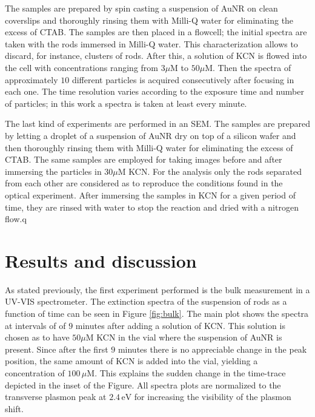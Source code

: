 \documentclass[twocolumn]{article}
\begin{document}
The samples are prepared by spin casting a suspension of AuNR on clean
coverslips and thoroughly rinsing them  with Milli-Q water for eliminating the
excess of CTAB. The samples are then placed in a flowcell; the initial spectra
are taken with the rods immersed in Milli-Q water. This characterization allows
to discard, for instance, clusters of rods. After this, a solution of KCN is
flowed into the cell with concentrations ranging from $3\mu\textrm{M}$ to
$50\mu\textrm{M}$. Then the spectra of approximately $10$ different particles is
acquired consecutively after focusing in each one. The time resolution varies
according to the exposure time and number of particles; in this work a spectra
is taken at least every minute.

The last kind of experiments are performed in an SEM. The samples are prepared
by letting a droplet of a suspension of AuNR dry on top of a silicon wafer and
then thoroughly rinsing them with Milli-Q water for eliminating the excess of
CTAB. The same samples are employed for taking images before and after immersing
the particles in $30\mu\textrm{M}$ KCN. For the analysis only the rods separated
from each other are considered as to reproduce the conditions found in the
optical experiment. After immersing the samples in KCN for a given period of
time, they are rinsed with water to stop the reaction and dried with a nitrogen
flow.q

\section{Results and discussion}

As stated previously, the first experiment performed is the bulk measurement in
a UV-VIS spectrometer. The extinction spectra of the suspension of rods as a
function of time can be seen in Figure \ref{fig:bulk}. The main plot shows the
spectra at intervals of of $9$ minutes after adding a solution of KCN. This
solution is chosen as to have $50\mu\textrm{M}$ KCN in the vial where the
suspension of AuNR is present. Since after the first $9$ minutes there is no appreciable
change in the peak position, the same amount of KCN is added into the vial,
yielding a concentration of $100\,\mu\textrm{M}$. This explains the sudden
change in the time-trace depicted in the inset of the Figure. All spectra plots are
normalized to the transverse plasmon peak at $2.4\,\textrm{eV}$ for increasing
the visibility of the plasmon shift.
\end{document}
